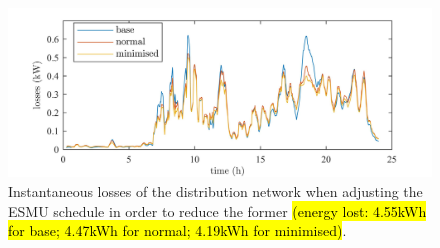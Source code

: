 \begin{figure}\centering
	\includegraphics{_chapter1/fig/results/ts-losses_}
\caption{Instantaneous losses of the distribution network when adjusting the ESMU schedule in order to reduce the former \hl{(energy lost: 4.55kWh for base; 4.47kWh for normal; 4.19kWh for minimised)}.}
\label{ch1:fig:ts-losses}
\end{figure}